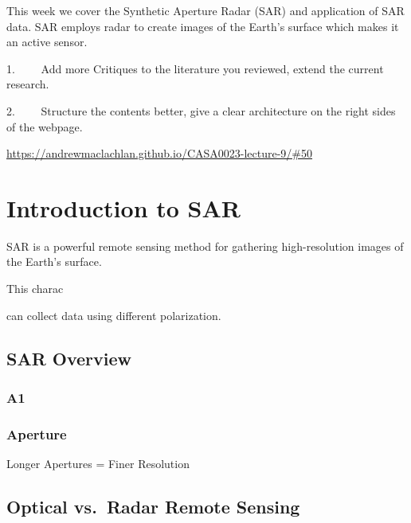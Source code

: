 \documentclass[
  letterpaper,
  DIV=11,
  numbers=noendperiod]{scrreprt}
\begin{document}
This week we cover the Synthetic Aperture Radar (SAR) and application of
SAR data. SAR employs radar to create images of the Earth's surface
which makes it an active sensor.

1.~~~~ Add more Critiques to the literature you reviewed, extend the
current research.

2.~~~~ Structure the contents better, give a clear architecture on the
right sides of the webpage.

\url{https://andrewmaclachlan.github.io/CASA0023-lecture-9/\#50}

\hypertarget{introduction-to-sar}{%
\section*{Introduction to SAR}\label{introduction-to-sar}}


SAR is a powerful remote sensing method for gathering high-resolution
images of the Earth's surface.

This charac

can collect data using different polarization.

\hypertarget{sar-overview}{%
\subsection*{SAR Overview}\label{sar-overview}}

\hypertarget{a1}{%
\subsubsection*{A1}\label{a1}}

\hypertarget{aperture}{%
\subsubsection*{Aperture}\label{aperture}}

Longer Apertures = Finer Resolution

\hypertarget{optical-vs.-radar-remote-sensing}{%
\subsection*{Optical vs.~Radar Remote
Sensing}\label{optical-vs.-radar-remote-sensing}}
\end{document}

